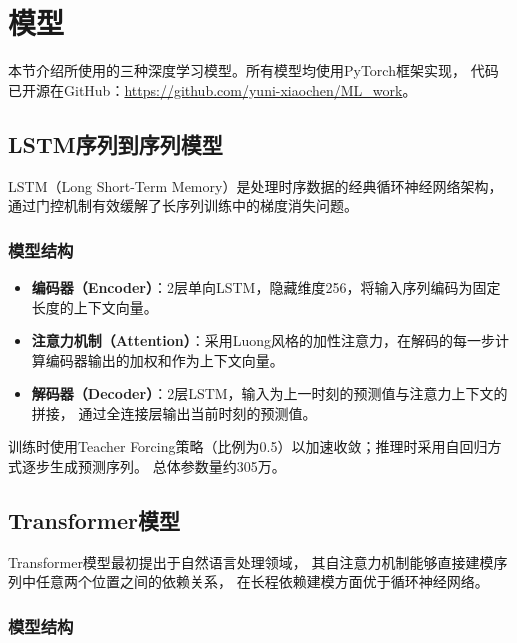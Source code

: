 \documentclass[12pt,a4paper]{ctexart}
\begin{document}
\section{模型}

本节介绍所使用的三种深度学习模型。所有模型均使用PyTorch框架实现，
代码已开源在GitHub：\url{https://github.com/yuni-xiaochen/ML\_work}。

\subsection{LSTM序列到序列模型}

LSTM（Long Short-Term Memory）是处理时序数据的经典循环神经网络架构，
通过门控机制有效缓解了长序列训练中的梯度消失问题。

\subsubsection{模型结构}

\begin{itemize}[nosep]
    \item \textbf{编码器（Encoder）}：2层单向LSTM，隐藏维度256，将输入序列编码为固定长度的上下文向量。
    \item \textbf{注意力机制（Attention）}：采用Luong风格的加性注意力，在解码的每一步计算编码器输出的加权和作为上下文向量。
    \item \textbf{解码器（Decoder）}：2层LSTM，输入为上一时刻的预测值与注意力上下文的拼接，
    通过全连接层输出当前时刻的预测值。
\end{itemize}

训练时使用Teacher Forcing策略（比例为0.5）以加速收敛；推理时采用自回归方式逐步生成预测序列。
总体参数量约305万。

\subsection{Transformer模型}

Transformer模型\cite{vaswani2017attention}最初提出于自然语言处理领域，
其自注意力机制能够直接建模序列中任意两个位置之间的依赖关系，
在长程依赖建模方面优于循环神经网络。

\subsubsection{模型结构}
\end{document}
